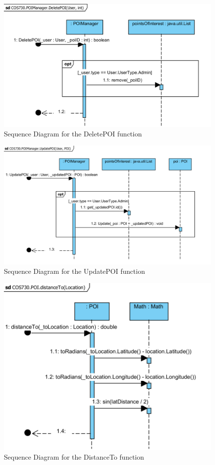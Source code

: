 \begin{figure}[!htb]
\includegraphics[width=\textwidth]{Images/DeletePOI_Sequence.png}
\caption{Sequence Diagram for the DeletePOI function}
\end{figure}

\begin{figure}[!htb]
\includegraphics[width=\textwidth]{Images/UpdatePOI_Sequence.png}
\caption{Sequence Diagram for the UpdatePOI function}
\end{figure}

\begin{figure}[!htb]
\includegraphics[width=\textwidth]{Images/DistanceTo_Sequence.png}
\caption{Sequence Diagram for the DistanceTo function}
\end{figure}

